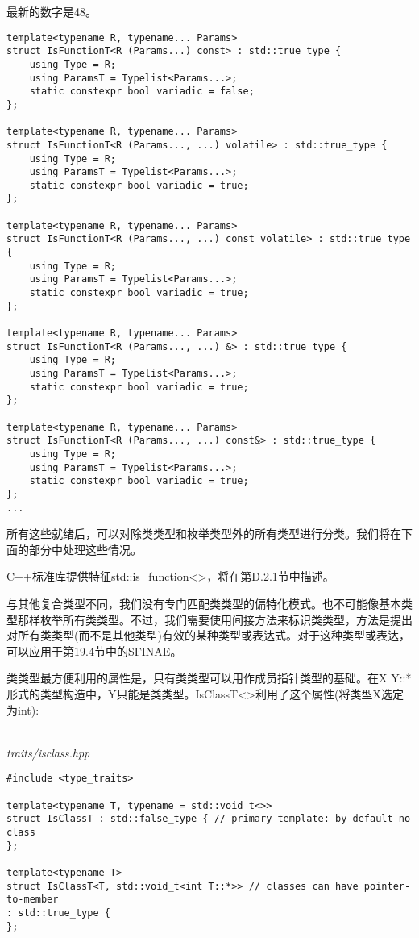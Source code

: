 \begin{tcolorbox}[colback=webgreen!5!white,colframe=webgreen!75!black]
\hspace*{0.75cm}最新的数字是48。
\end{tcolorbox}

\begin{lstlisting}[style=styleCXX]
template<typename R, typename... Params>
struct IsFunctionT<R (Params...) const> : std::true_type {
	using Type = R;
	using ParamsT = Typelist<Params...>;
	static constexpr bool variadic = false;
};

template<typename R, typename... Params>
struct IsFunctionT<R (Params..., ...) volatile> : std::true_type {
	using Type = R;
	using ParamsT = Typelist<Params...>;
	static constexpr bool variadic = true;
};

template<typename R, typename... Params>
struct IsFunctionT<R (Params..., ...) const volatile> : std::true_type {
	using Type = R;
	using ParamsT = Typelist<Params...>;
	static constexpr bool variadic = true;
};

template<typename R, typename... Params>
struct IsFunctionT<R (Params..., ...) &> : std::true_type {
	using Type = R;
	using ParamsT = Typelist<Params...>;
	static constexpr bool variadic = true;
};

template<typename R, typename... Params>
struct IsFunctionT<R (Params..., ...) const&> : std::true_type {
	using Type = R;
	using ParamsT = Typelist<Params...>;
	static constexpr bool variadic = true;
};
...
\end{lstlisting}

所有这些就绪后，可以对除类类型和枚举类型外的所有类型进行分类。我们将在下面的部分中处理这些情况。

C++标准库提供特征std::is\_function<>，将在第D.2.1节中描述。


与其他复合类型不同，我们没有专门匹配类类型的偏特化模式。也不可能像基本类型那样枚举所有类类型。不过，我们需要使用间接方法来标识类类型，方法是提出对所有类类型(而不是其他类型)有效的某种类型或表达式。对于这种类型或表达，可以应用于第19.4节中的SFINAE。

类类型最方便利用的属性是，只有类类型可以用作成员指针类型的基础。在X Y::*形式的类型构造中，Y只能是类类型。IsClassT<>利用了这个属性(将类型X选定为int):

\hspace*{\fill} \\ %
\noindent
\textit{traits/isclass.hpp}
\begin{lstlisting}[style=styleCXX]
#include <type_traits>

template<typename T, typename = std::void_t<>>
struct IsClassT : std::false_type { // primary template: by default no class
};

template<typename T>
struct IsClassT<T, std::void_t<int T::*>> // classes can have pointer-to-member
: std::true_type {
};
\end{lstlisting}

